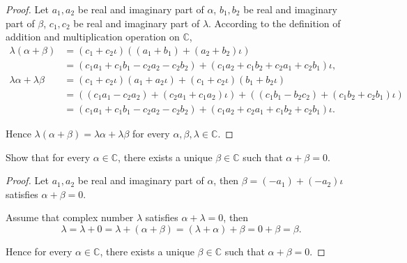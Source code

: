 \begin{proof}
    Let $a_{1}, a_{2}$ be real and imaginary part of $\alpha$, $b_{1}, b_{2}$ be real and imaginary part of $\beta$, $c_{1}, c_{2}$ be real and imaginary part of $\lambda$. According to the definition of addition and multiplication operation on $\mathbb{C}$,
    \begin{align*}
        \lambda(\alpha + \beta)      & = (c_{1} + c_{2}\iota)((a_{1} + b_{1}) + (a_{2} + b_{2})\iota)                                                                \\
                                     & = (c_{1}a_{1} + c_{1}b_{1} - c_{2}a_{2} - c_{2}b_{2}) + (c_{1}a_{2} + c_{1}b_{2} + c_{2}a_{1} + c_{2}b_{1})\iota,             \\
        \lambda\alpha + \lambda\beta & = (c_{1} + c_{2}\iota)(a_{1} + a_{2}\iota) + (c_{1} + c_{2}\iota)(b_{1} + b_{2}\iota)                                         \\
                                     & = ((c_{1}a_{1} - c_{2}a_{2}) + (c_{2}a_{1} + c_{1}a_{2})\iota) + ((c_{1}b_{1} - b_{2}c_{2}) + (c_{1}b_{2} + c_{2}b_{1})\iota) \\
                                     & = (c_{1}a_{1} + c_{1}b_{1} - c_{2}a_{2} - c_{2}b_{2}) + (c_{1}a_{2} + c_{2}a_{1} + c_{1}b_{2} + c_{2}b_{1})\iota.
    \end{align*}

    Hence $\lambda(\alpha + \beta) = \lambda\alpha + \lambda\beta$ for every $\alpha, \beta, \lambda\in\mathbb{C}$.
\end{proof}

\begin{exercise}
    Show that for every $\alpha\in\mathbb{C}$, there exists a unique $\beta\in\mathbb{C}$ such that $\alpha + \beta = 0$.
\end{exercise}

\begin{proof}
    Let $a_{1}, a_{2}$ be real and imaginary part of $\alpha$, then $\beta = (-a_{1}) + (-a_{2})\iota$ satisfies $\alpha + \beta = 0$.

    Assume that complex number $\lambda$ satisfies $\alpha + \lambda = 0$, then
    \[
        \lambda = \lambda + 0 = \lambda + (\alpha + \beta) = (\lambda + \alpha) + \beta = 0 + \beta = \beta.
    \]

    Hence for every $\alpha\in \mathbb{C}$, there exists a unique $\beta\in \mathbb{C}$ such that $\alpha + \beta = 0$.
\end{proof}

